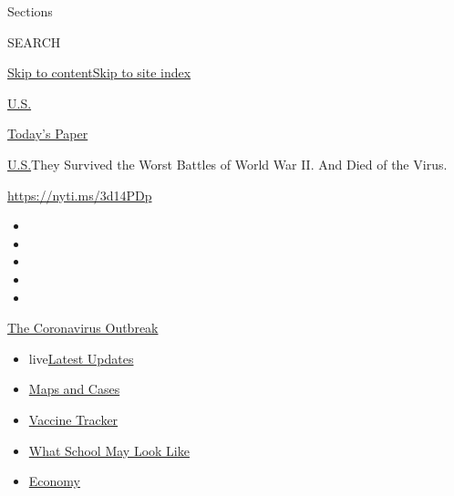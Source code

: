 Sections

SEARCH

\protect\hyperlink{site-content}{Skip to
content}\protect\hyperlink{site-index}{Skip to site index}

\href{https://www.nytimes.com/section/us}{U.S.}

\href{https://myaccount.nytimes.com/auth/login?response_type=cookie\&client_id=vi}{}

\href{https://www.nytimes.com/section/todayspaper}{Today's Paper}

\href{/section/us}{U.S.}\textbar{}They Survived the Worst Battles of
World War II. And Died of the Virus.

\url{https://nyti.ms/3d14PDp}

\begin{itemize}
\item
\item
\item
\item
\item
\end{itemize}

\href{https://www.nytimes.com/news-event/coronavirus?action=click\&pgtype=Article\&state=default\&region=TOP_BANNER\&context=storylines_menu}{The
Coronavirus Outbreak}

\begin{itemize}
\tightlist
\item
  live\href{https://www.nytimes.com/2020/08/01/world/coronavirus-covid-19.html?action=click\&pgtype=Article\&state=default\&region=TOP_BANNER\&context=storylines_menu}{Latest
  Updates}
\item
  \href{https://www.nytimes.com/interactive/2020/us/coronavirus-us-cases.html?action=click\&pgtype=Article\&state=default\&region=TOP_BANNER\&context=storylines_menu}{Maps
  and Cases}
\item
  \href{https://www.nytimes.com/interactive/2020/science/coronavirus-vaccine-tracker.html?action=click\&pgtype=Article\&state=default\&region=TOP_BANNER\&context=storylines_menu}{Vaccine
  Tracker}
\item
  \href{https://www.nytimes.com/interactive/2020/07/29/us/schools-reopening-coronavirus.html?action=click\&pgtype=Article\&state=default\&region=TOP_BANNER\&context=storylines_menu}{What
  School May Look Like}
\item
  \href{https://www.nytimes.com/live/2020/07/31/business/stock-market-today-coronavirus?action=click\&pgtype=Article\&state=default\&region=TOP_BANNER\&context=storylines_menu}{Economy}
\end{itemize}

